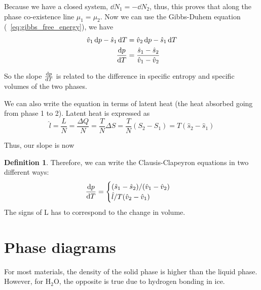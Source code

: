 \documentclass[12pt,chapterprefix=false,dvipsnames]{scrbook}
\theoremstyle{dotless}
\theoremstyle{definition}
\newtheorem{protodefinition}{Definition}[section]
\newenvironment{definition}
{\colorlet{shadecolor}{black!15}\begin{shaded}\begin{protodefinition}}
			{\end{protodefinition}\end{shaded}}
\begin{document}
Because we have a closed system, $\dd{N}_1 = -\dd{N}_2$, thus,
this proves that along the phase co-existence line
$\mu_1 = \mu_2$. Now we can use the Gibbs-Duhem equation
(~\ref{eq:gibbs_free_energy}), we have
\begin{equation}
	\begin{aligned}
		\hat{v}_1\dd{p} - \hat{s}_1\dd{T} & = \hat{v}_2\dd{p} - \hat{s}_1 \dd{T}                      \\
		\dv{p}{T}                         & = \frac{ \hat{s}_1 - \hat{s}_2 }{ \hat{v}_1 - \hat{v}_2 }
	\end{aligned}
\end{equation}

So the slope $\dv{p}{T}$ is related to the
difference in specific entropy and specific volumes of the two
phases.

We can also write the equation in terms of latent heat (the heat
absorbed going from phase 1 to 2). Latent heat is expressed as
\begin{equation}
	\hat{l} = \frac{L}{N} =
	\frac{\Delta Q}{N} = \frac{T}{N} \Delta S =
	\frac{T}{N}( S_2 - S_1 ) = T( \hat{s}_2 -
	\hat{s}_1 )
\end{equation}

Thus, our slope is now
\begin{equation}
\end{equation}

\begin{definition}
	Therefore, we can write the Clausis-Clapeyron equations in two
	different ways:
	\begin{equation}
		\label{eq:clausis-clapeyron-equations}
		\dv{p}{T} =
		\begin{cases}
			( \hat{s}_1 - \hat{s}_2 )/( \hat{v}_1 - \hat{v}_2 ) \\
			{ \hat{l} }/{T ( \hat{v}_2 - \hat{v}_1 )}
		\end{cases}
	\end{equation}
	The signs of L has to correspond to the change in volume.
\end{definition}

\section{Phase diagrams}%
\label{sec:phase_diagrams}

For most materials, the density of the solid phase is higher
than the liquid phase. However, for $\mathrm{H}_2\mathrm{O}$, the
opposite is true due to hydrogen bonding in ice.
\end{document}
